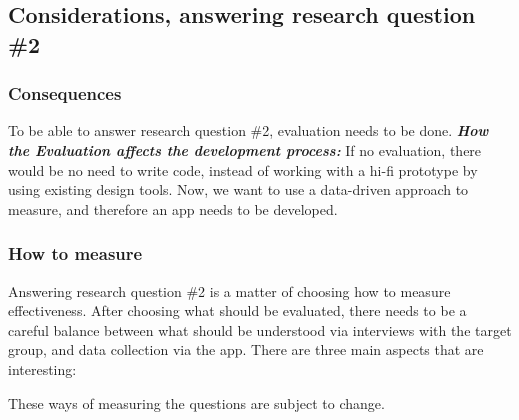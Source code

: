 \subsection{Considerations, answering research question \#2}

\subsubsection{Consequences}

To be able to answer research question \#2, evaluation needs to be done. \textbf{\textit{How the Evaluation affects the development process: }} If no evaluation, there would be no need to write code, instead of working with a hi-fi prototype by using existing design tools. Now, we want to use a data-driven approach to measure, and therefore an app needs to be developed.\\

\subsubsection{How to measure}

Answering research question \#2 is a matter of choosing how to measure effectiveness. After choosing what should be evaluated, there needs to be a careful balance between what should be understood via interviews with the target group, and data collection via the app. There are three main aspects that are interesting:

These ways of measuring the questions are subject to change.


